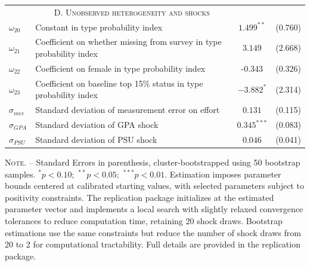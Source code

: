 \begin{table}[H]
\begin{tabular}{l*{1}{lcc}}
 & \multicolumn{1}{c}{\textsc{D. Unobserved heterogeneity and shocks}} & &\\
$\omega_{20}$ & Constant in type probability index & $1.499^{**}$ & (0.760) \\
$\omega_{21}$ & Coefficient on whether missing from survey in type probability index & $3.149$ & (2.668) \\
$\omega_{22}$ & Coefficient on female in type probability index & -0.343 & (0.326) \\
$\omega_{23}$ & Coefficient on baseline top 15\% status in type probability index & $-3.882^{*}$ & (2.314) \\
$\sigma_{mee}$ & Standard deviation of measurement error on effort & $0.131$ & (0.115) \\

$\sigma_{GPA}$ & Standard deviation of GPA shock & $0.345^{***}$ & (0.083) \\
$\sigma_{PSU}$ & Standard deviation of PSU shock & $0.046$ & (0.041) \\

\hline
\end{tabular}
\vskip-10pt
\begin{tablenotes}[flushleft]\singlespacing
\item \scriptsize \textsc{Note. --} Standard Errors in parenthesis, cluster-bootstrapped using 50 bootstrap samples. $^{*}p<0.10;$ $^{**}p<0.05;$ $^{***}p<0.01.$ Estimation imposes parameter bounds centered at calibrated starting values, with selected parameters subject to positivity constraints. The replication package initializes at the estimated parameter vector and implements a local search with slightly relaxed convergence tolerances to reduce computation time, retaining 20 shock draws. Bootstrap estimations use the same constraints but reduce the number of shock draws from 20 to 2 for computational tractability. Full details are provided in the replication package.
\end{tablenotes}
\end{table}
